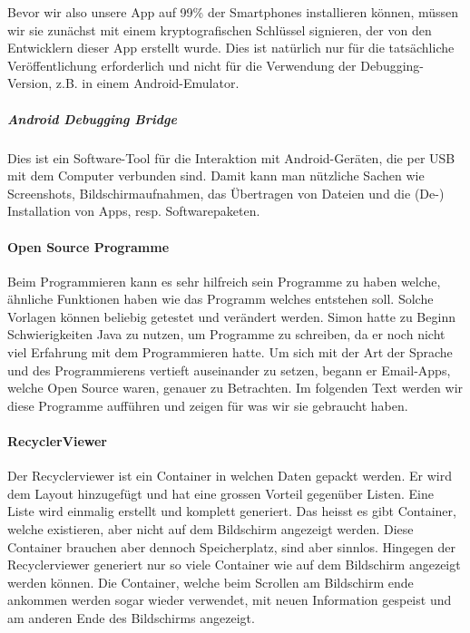 \documentclass[a4paper,11pt]{article}
\begin{document}
Bevor wir also unsere App auf 99\% der Smartphones installieren können, müssen wir sie zunächst mit einem kryptografischen Schlüssel signieren, der von den Entwicklern dieser App erstellt wurde. Dies ist natürlich nur für die tatsächliche Veröffentlichung erforderlich und nicht für die Verwendung der Debugging-Version, z.B. in einem Android-Emulator.

\subparagraph{Android Debugging Bridge}

Dies ist ein Software-Tool für die Interaktion mit Android-Geräten, die per USB mit dem Computer verbunden sind. Damit kann man nützliche Sachen wie Screenshots, Bildschirmaufnahmen, das Übertragen von Dateien und die (De-) Installation von Apps, resp. Softwarepaketen.

\paragraph{Open Source Programme}

Beim Programmieren kann es sehr hilfreich sein Programme zu haben welche, ähnliche Funktionen haben wie das Programm welches entstehen soll. 
Solche Vorlagen können beliebig getestet und verändert werden. Simon hatte zu Beginn Schwierigkeiten Java zu nutzen, um Programme zu schreiben, da er noch nicht viel 
Erfahrung mit dem Programmieren hatte. Um sich mit der Art der Sprache und des Programmierens vertieft auseinander zu setzen, begann er Email-Apps, welche Open Source
waren, genauer zu Betrachten. Im folgenden Text werden wir diese Programme aufführen und zeigen für was wir sie gebraucht haben. 


\paragraph{RecyclerViewer}

Der Recyclerviewer ist ein Container in welchen Daten gepackt werden. Er wird dem Layout hinzugefügt und hat eine grossen Vorteil gegenüber Listen. 
Eine Liste wird einmalig erstellt und komplett generiert. Das heisst es gibt Container, welche existieren, aber nicht auf dem Bildschirm angezeigt werden. 
Diese Container brauchen aber dennoch Speicherplatz, sind aber sinnlos. Hingegen der Recyclerviewer generiert nur so viele Container wie auf dem Bildschirm angezeigt werden können. 
Die Container, welche beim Scrollen am Bildschirm ende ankommen werden sogar wieder verwendet, mit neuen Information gespeist und am anderen Ende des Bildschirms angezeigt.
\end{document}
